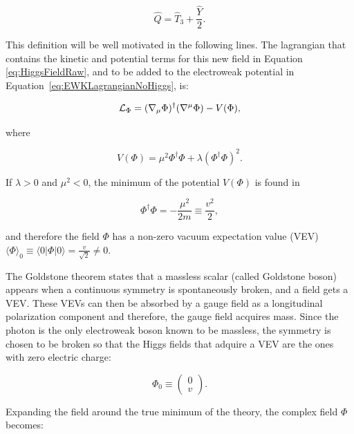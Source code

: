 \begin{equation}
\hat{Q} = \hat{T}_3 + \frac{\hat{Y}}{2}.
\label{eq:ElectricChargeDefinition}
\end{equation}

This definition will be well motivated in the following lines. 
The lagrangian that contains the kinetic and potential terms for this new field in Equation \ref{eq:HiggsFieldRaw}, and to be added to the electroweak potential in Equation~\ref{eq:EWKLagrangianNoHiggs}, is:

\begin{equation}
\mathcal{L}_{\Phi} = (\nabla_\mu \Phi)^{\dagger} (\nabla^\mu \Phi) - V(\Phi),
\label{eq:HiggsLagrangian}
\end{equation}

\noindent where

\begin{equation}
V(\Phi) = \mu^2 \Phi^{\dagger} \Phi + \lambda(\Phi^{\dagger} \Phi)^2.
\label{eq:HiggsPotential}
\end{equation}

If $\lambda>0$ and $\mu^2<0$, the minimum of the potential $V(\Phi)$ is found in

\begin{equation}
\Phi^{\dagger} \Phi = -\frac{\mu^2}{2m} \equiv \frac{v^2}{2}, 
\label{eq:HiggsMinimumOfPotential}
\end{equation}

\noindent and therefore the field $\Phi$ has a non-zero vacuum expectation value (VEV) $\langle\Phi\rangle_0 \equiv \langle0|\Phi|0\rangle = \frac{v}{\sqrt{2}}\neq 0$.

The Goldstone theorem states that a massless scalar (called Goldstone boson) appears when a continuous symmetry is spontaneously broken, and a field gets a VEV.
These VEVs can then be absorbed by a gauge field as a longitudinal polarization component and therefore, the gauge field acquires mass.
Since the photon is the only electroweak boson known to be massless, the symmetry is chosen to be broken so that the Higgs fields that adquire a VEV are the ones with zero electric charge:

\begin{equation}
\Phi_0 \equiv \left(
    \begin{matrix}
    0 \\
    v
    \end{matrix}
    \right).
\label{eq:VEVdefinition}
\end{equation}

Expanding the field around the true minimum of the theory, the complex field $\Phi$ becomes:

